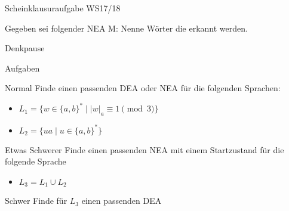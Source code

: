{
\begin{frame}{Scheinklausuraufgabe WS17/18}
\begin{alertblock} {Gegeben sei folgender NEA M:}
Nenne Wörter die erkannt werden.\\
\end{alertblock}
\end{frame}
}

{
\begin{frame}{Denkpause}
\footnotesize
    \begin{alertblock}{Aufgaben}
    \end{alertblock}
    \begin{block}{Normal}
    Finde einen passenden DEA oder NEA für die folgenden Sprachen:
    \begin{itemize}
        \item $L_1 = \{w \in \{a,b\}^* \mid |w|_a \equiv 1 \pmod{3}\}$
        \item $L_2 = \{ua\mid u \in \{a,b\}^*\}$
    \end{itemize}
    \end{block}
    \begin{block}{Etwas Schwerer}
    Finde einen passenden NEA mit \alert{einem Startzustand} für die folgende Sprache
    \begin{itemize}
        \item $L_3 = L_1 \cup L_2$
    \end{itemize}
    \end{block}
    \begin{block}{Schwer}
        Finde für $L_3$ einen passenden DEA
    \end{block}
\end{frame}
}

